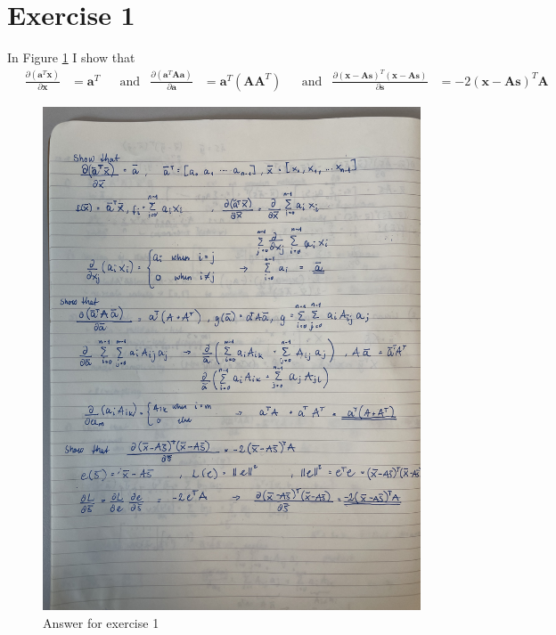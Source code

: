 \section{Exercise 1}\label{sec:ex1}
In Figure \ref{fig:ex1} I show that 
\begin{align*}
    \quad \frac{\partial (\mathbf{a}^{T}\mathbf{x})}{\partial \mathbf{x}} &= \mathbf{a}^{T} && \text{and} & \frac{\partial (\mathbf{a}^{T} \mathbf{A} \mathbf{a})}{\partial \mathbf{a}} &= \mathbf{a}^{T} (\mathbf{A} \mathbf{A}^{T}) && \text{and} & \frac{\partial (\mathbf{x} - \mathbf{A} \mathbf{s})^{T} (\mathbf{x} - \mathbf{A} \mathbf{s})}{\partial \mathbf{s}} &= -2 (\mathbf{x} - \mathbf{A} \mathbf{s})^{T} \mathbf{A}
\end{align*}

\begin{figure}
    \centering
    \includegraphics[width=0.8\linewidth, angle=270]{latex/figures/ex1.jpeg}
    \caption{Answer for exercise 1}
    \label{fig:ex1}
\end{figure}

